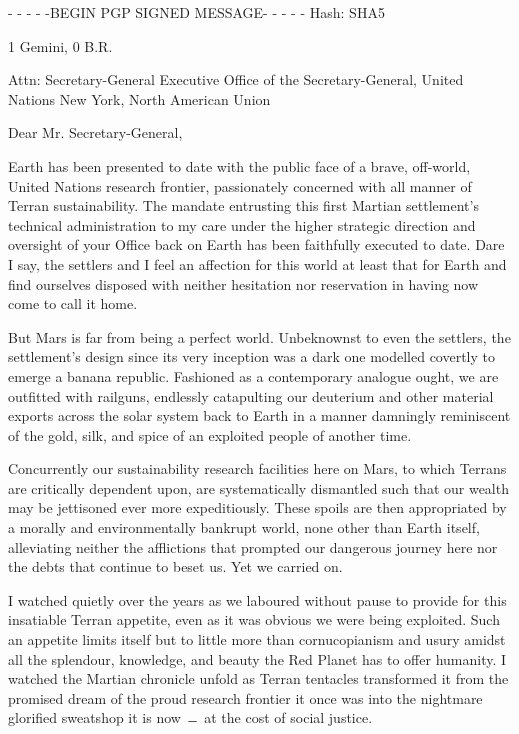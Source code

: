 
\startlines
- - - - -BEGIN PGP SIGNED MESSAGE- - - - -
Hash: SHA5

1 Gemini, 0 B.R.

Attn: Secretary-General
Executive Office of the Secretary-General, United Nations
New York, North American Union
\blank

Dear Mr. Secretary-General,

Earth has been presented to date with the public face of a brave, off-world, United Nations research frontier, passionately concerned with all manner of Terran sustainability. The mandate entrusting this first Martian settlement's technical administration to my care under the higher strategic direction and oversight of your Office back on Earth has been faithfully executed to date. Dare I say, the settlers and I feel an affection for this world at least that for Earth and find ourselves disposed with neither hesitation nor reservation in having now come to call it home.

But Mars is far from being a perfect world. Unbeknownst to even the settlers, the settlement's design since its very inception was a dark one modelled covertly to emerge a banana republic. Fashioned as a contemporary analogue ought, we are outfitted with railguns, endlessly catapulting our deuterium and other material exports across the solar system back to Earth in a manner damningly reminiscent of the gold, silk, and spice of an exploited people of another time.

Concurrently our sustainability research facilities here on Mars, to which Terrans are critically dependent upon, are systematically dismantled such that our wealth may be jettisoned ever more expeditiously. These spoils are then appropriated by a morally and environmentally bankrupt world, none other than Earth itself, alleviating neither the afflictions that prompted our dangerous journey here nor the debts that continue to beset us. Yet we carried on.

I watched quietly over the years as we laboured without pause to provide for this insatiable Terran appetite, even as it was obvious we were being exploited. Such an appetite limits itself but to little more than cornucopianism and usury amidst all the splendour, knowledge, and beauty the Red Planet has to offer humanity. I watched the Martian chronicle unfold as Terran tentacles transformed it from the promised dream of the proud research frontier it once was into the nightmare glorified sweatshop it is now ﹘ at the cost of social justice. 

